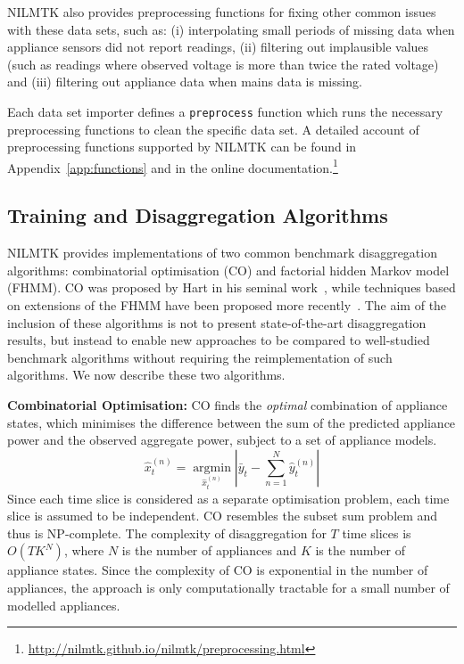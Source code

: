 \documentclass{sig-alternate}
\newcommand{\bluecolor}[1]{\textcolor{blue}{#1}}
\newcommand{\appref}[1]{Appendix~\ref{#1}}
\begin{document}
NILMTK also provides preprocessing functions for fixing
other common issues with these data sets, such as: (i) interpolating
small periods of missing data when appliance sensors did not report
readings, (ii) filtering out implausible values (such as readings
where observed voltage is more than twice the rated voltage) and (iii)
filtering out appliance data when mains data is missing.

Each data set importer defines a \texttt{preprocess}
function which runs the necessary preprocessing functions to clean
the specific data set. A detailed account of preprocessing functions supported by NILMTK can be found in
\appref{app:functions} and in the online documentation.\footnote{
  \url{http://nilmtk.github.io/nilmtk/preprocessing.html}}

\subsection{Training and Disaggregation Algorithms}
\label{sec:training}
\noindent
NILMTK provides implementations of two common benchmark disaggregation algorithms: combinatorial optimisation (CO) and factorial hidden Markov model (FHMM). CO was proposed by Hart in his seminal work~\cite{hart_1992}, while techniques based on extensions of the FHMM have been proposed more recently~\cite{redd,kim_2011}. The aim of the inclusion of these algorithms is not to present state-of-the-art disaggregation results, but instead to enable new approaches to be compared to well-studied benchmark algorithms without requiring the reimplementation of such algorithms. We now describe these two algorithms.

\textbf{Combinatorial Optimisation:}
CO finds the \textit{optimal} combination of appliance states, which minimises the difference between the sum of the predicted appliance power and the observed aggregate power, subject to a set of appliance models. 
\begin{equation}
\hat{x}^{(n)}_t=\operatorname*{arg min}_{\hat{x}^{(n)}_t}\left|\bar{y}_t-\sum\limits_{n=1}^{N}\hat{y}^{(n)}_t\right|
\end{equation}
Since each time slice is considered as a separate optimisation problem, each time slice is assumed to be independent.
CO resembles the subset sum problem and thus is NP-complete. The complexity of disaggregation for $T$ time slices is $O(TK^N)$, where $N$ is the number of appliances and $K$ is the number of appliance states. Since the complexity of CO is exponential in the number of appliances, the approach is only computationally tractable for a small number of modelled appliances.
\end{document}
